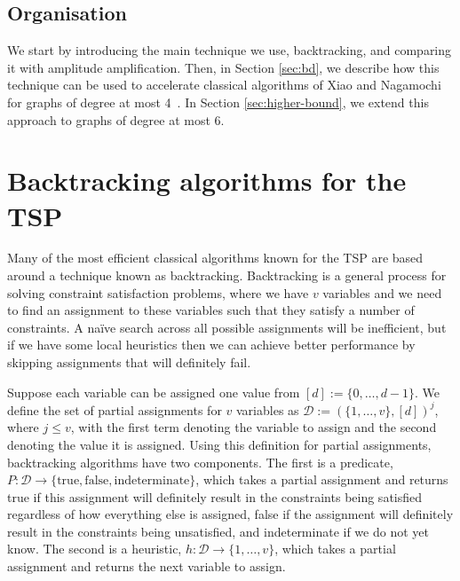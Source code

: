 \subsection{Organisation}

We start by introducing the main technique we use, backtracking, and comparing it with amplitude amplification. Then, in Section \ref{sec:bd}, we describe how this technique can be used to accelerate classical algorithms of Xiao and Nagamochi for graphs of degree at most 4~\cite{xiao2016degree3,xiao2016degree4}. In Section \ref{sec:higher-bound}, we extend this approach to graphs of degree at most 6.




\section{Backtracking algorithms for the TSP}
\label{sec:backtrack}

Many of the most efficient classical algorithms known for the TSP are based around a technique known as backtracking. Backtracking is a general process for solving constraint satisfaction problems, where we have $v$ variables and we need to find an assignment to these variables such that they satisfy a number of constraints. A na\"{i}ve search across all possible assignments will be inefficient, but if we have some local heuristics then we can achieve better performance by skipping assignments that will definitely fail.

Suppose each variable can be assigned one value from $[d] := \{0, \dots,d-1\}$. We define the set of partial assignments for $v$ variables as $\mathcal{D} := (\{1,\dots,v\}, [d])^j$, where $j \leq v$, with the first term denoting the variable to assign and the second denoting the value it is assigned. Using this definition for partial assignments, backtracking algorithms have two components. The first is a predicate, $P:\mathcal{D} \rightarrow \{\text{true}, \text{false}, \text{indeterminate}\}$, which takes a partial assignment and returns true if this assignment will definitely result in the constraints being satisfied regardless of how everything else is assigned, false if the assignment will definitely result in the constraints being unsatisfied, and indeterminate if we do not yet know. The second is a heuristic, $h:\mathcal{D} \rightarrow \{1,\dots,v\}$, which takes a partial assignment and returns the next variable to assign.

